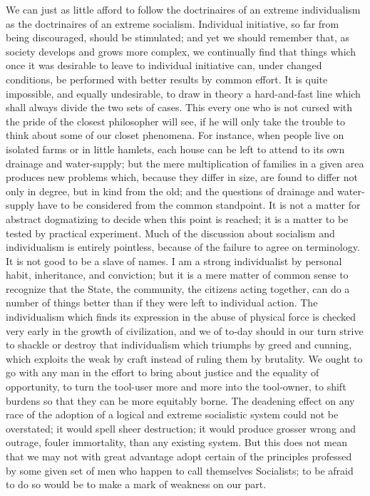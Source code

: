 \documentclass[a4paper]{amsbook}
\begin{document}
We can just as little afford to follow the doctrinaires of an extreme individualism as the doctrinaires of an extreme socialism. Individual initiative, so far from being discouraged, should be stimulated; and yet we should remember that, as society develops and grows more complex, we continually find that things which once it was desirable to leave to individual initiative can, under changed conditions, be performed with better results by common effort. It is quite impossible, and equally undesirable, to draw in theory a hard-and-fast line which shall always divide the two sets of cases. This every one who is not cursed with the pride of the closest philosopher will see, if he will only take the trouble to think about some of our closet phenomena. For instance, when people live on isolated farms or in little hamlets, each house can be left to attend to its own drainage and water-supply; but the mere multiplication of families in a given area produces new problems which, because they differ in size, are found to differ not only in degree, but in kind from the old; and the questions of drainage and water-supply have to be considered from the common standpoint. It is not a matter for abstract dogmatizing to decide when this point is reached; it is a matter to be tested by practical experiment. Much of the discussion about socialism and individualism is entirely pointless, because of the failure to agree on terminology. It is not good to be a slave of names. I am a strong individualist by personal habit, inheritance, and conviction; but it is a mere matter of common sense to recognize that the State, the community, the citizens acting together, can do a number of things better than if they were left to individual action. The individualism which finds its expression in the abuse of physical force is checked very early in the growth of civilization, and we of to-day should in our turn strive to shackle or destroy that individualism which triumphs by greed and cunning, which exploits the weak by craft instead of ruling them by brutality. We ought to go with any man in the effort to bring about justice and the equality of opportunity, to turn the tool-user more and more into the tool-owner, to shift burdens so that they can be more equitably borne. The deadening effect on any race of the adoption of a logical and extreme socialistic system could not be overstated; it would spell sheer destruction; it would produce grosser wrong and outrage, fouler immortality, than any existing system. But this does not mean that we may not with great advantage adopt certain of the principles professed by some given set of men who happen to call themselves Socialists; to be afraid to do so would be to make a mark of weakness on our part.
\end{document}
